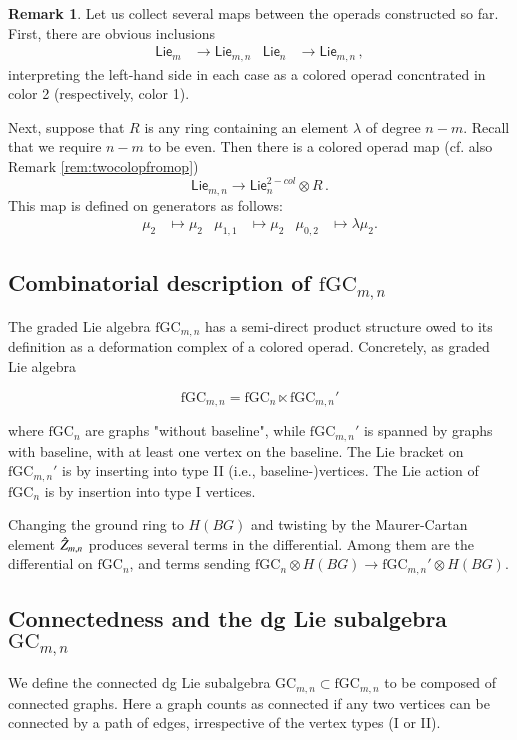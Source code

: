 \documentclass[a4paper]{amsart}
\theoremstyle{plain}
\theoremstyle{definition}
\newtheorem{rem}{Remark}
\newcommand{\Lie}{\mathsf{Lie}}
\newcommand{\GC}{\mathrm{GC}}
\newcommand{\fGC}{\mathrm{fGC}}
\newcommand{\beq}[1]{
\begin{equation}\label{#1}
}
\newcommand{\eeq}{
\end{equation}
}
\begin{document}
\begin{rem}
 Let us collect several maps between the operads constructed so far.
First, there are obvious inclusions 
\begin{align}\label{equ:Liemninclusions}
 \Lie_m&\to \Lie_{m,n} & \Lie_n&\to \Lie_{m,n}\, ,
\end{align}
interpreting the left-hand side in each case as a colored operad concntrated in color 2 (respectively, color 1).

Next, suppose that $R$ is any ring containing an element $\lambda$ of degree $n-m$. Recall that we require $n-m$ to be even. Then there is a colored operad map (cf. also Remark \ref{rem:twocolopfromop})
\begin{equation}
 \label{equ:Liemn2Lie}
\Lie_{m,n} \to \Lie_n^{2-col} \otimes R \,.
\end{equation}
This map is defined on generators as follows:
\begin{align*}
 \mu_2 &\mapsto \mu_2 
&
\mu_{1,1} &\mapsto \mu_2
&
\mu_{0,2} &\mapsto \lambda \mu_2.
\end{align*}

\end{rem}


\subsection{Combinatorial description of $\fGC_{m,n}$}
The graded Lie algebra $\fGC_{m,n}$ has a semi-direct product structure owed to its definition as a deformation complex of a colored operad.
Concretely, as graded Lie algebra
\beq{equ:fsplitting}
\fGC_{m,n} = \fGC_n \ltimes \fGC_{m,n}'
\eeq
where $\fGC_n$ are graphs "without baseline", while $\fGC_{m,n}'$ is spanned by graphs with baseline, with at least one vertex on the baseline.
The Lie bracket on $\fGC_{m,n}'$ is by inserting into type II (i.e., baseline-)vertices. The Lie action of $\fGC_n$ is by insertion into type I vertices.

Changing the ground ring to $H(BG)$ and twisting by the Maurer-Cartan element $\hat Z_{m,n}$ produces several terms in the differential.
Among them are the differential on $\fGC_n$, and terms sending $\fGC_n\otimes H(BG)\to \fGC_{m,n}'\otimes H(BG)$.

\subsection{Connectedness and the dg Lie subalgebra $\GC_{m,n}$ }
We define the connected dg Lie subalgebra $\GC_{m,n}\subset \fGC_{m,n}$ to be composed of connected graphs.
Here a graph counts as connected if any two vertices can be connected by a path of edges, irrespective of the vertex types (I or II).
\end{document}
